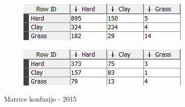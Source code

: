 \documentclass[a4paper]{article}
\begin{document}
\begin{figure}[H]
	\begin{subfigure}[h]{\textwidth}
		\begin{center}
			\includegraphics[scale=0.60]{Klasifikacija/DrvoOdlucivanja/2015/MatricaKonfuzijeTrening.png}
		\end{center}
		\label{fig:MatricaKnfuzijeTrening2015}
	\end{subfigure}

	\vspace{0.5cm}
	\begin{subfigure}[h]{\textwidth}
		\begin{center}
			\includegraphics[scale=0.60]{Klasifikacija/DrvoOdlucivanja/2015/MatricaKonfuzijeTest.png}
		\end{center}
		\label{fig:MatricaKnfuzijeTest2015}
	\end{subfigure}
	\caption{Matrice konfuzije - 2015}
	\label{fig:MatricaKnfuzije2015}
\end{figure}
\end{document}
